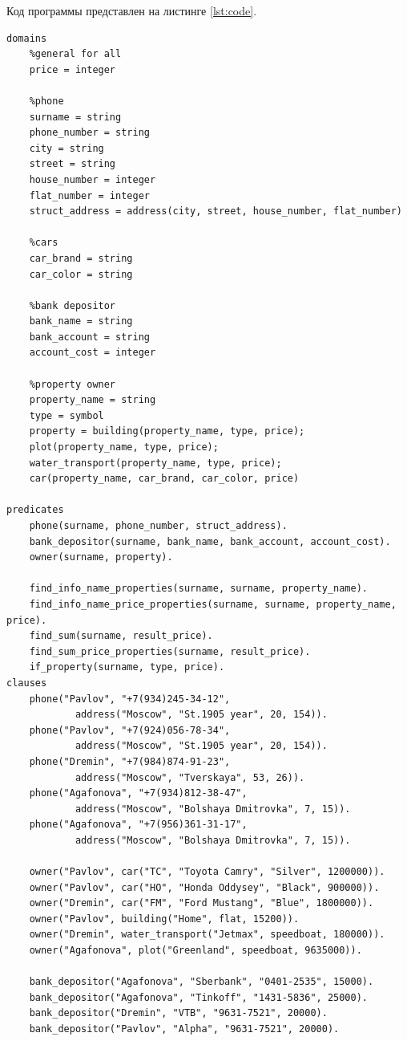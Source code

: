Код программы представлен на листинге \ref{lst:code}.

\begin{lstlisting}[label=lst:code, basicstyle=\footnotesize, caption=Код программы]
domains
	%general for all
	price = integer
	
	%phone
	surname = string
	phone_number = string
	city = string
	street = string
	house_number = integer
	flat_number = integer
	struct_address = address(city, street, house_number, flat_number)
	
	%cars
	car_brand = string
	car_color = string
	
	%bank depositor
	bank_name = string
	bank_account = string
	account_cost = integer
	
	%property owner
	property_name = string
	type = symbol
	property = building(property_name, type, price);
	plot(property_name, type, price);
	water_transport(property_name, type, price);
	car(property_name, car_brand, car_color, price)
	
predicates
	phone(surname, phone_number, struct_address).
	bank_depositor(surname, bank_name, bank_account, account_cost).
	owner(surname, property).
	
	find_info_name_properties(surname, surname, property_name).
	find_info_name_price_properties(surname, surname, property_name, price).
	find_sum(surname, result_price).
	find_sum_price_properties(surname, result_price).
	if_property(surname, type, price).
clauses
	phone("Pavlov", "+7(934)245-34-12", 
			address("Moscow", "St.1905 year", 20, 154)).
	phone("Pavlov", "+7(924)056-78-34",
			address("Moscow", "St.1905 year", 20, 154)).
	phone("Dremin", "+7(984)874-91-23",
			address("Moscow", "Tverskaya", 53, 26)).
	phone("Agafonova", "+7(934)812-38-47", 
			address("Moscow", "Bolshaya Dmitrovka", 7, 15)).
	phone("Agafonova", "+7(956)361-31-17", 
			address("Moscow", "Bolshaya Dmitrovka", 7, 15)).
	
	owner("Pavlov", car("TC", "Toyota Camry", "Silver", 1200000)).
	owner("Pavlov", car("HO", "Honda Oddysey", "Black", 900000)).
	owner("Dremin", car("FM", "Ford Mustang", "Blue", 1800000)).
	owner("Pavlov", building("Home", flat, 15200)).
	owner("Dremin", water_transport("Jetmax", speedboat, 180000)).
	owner("Agafonova", plot("Greenland", speedboat, 9635000)).
	
	bank_depositor("Agafonova", "Sberbank", "0401-2535", 15000).
	bank_depositor("Agafonova", "Tinkoff", "1431-5836", 25000).
	bank_depositor("Dremin", "VTB", "9631-7521", 20000).
	bank_depositor("Pavlov", "Alpha", "9631-7521", 20000).
	

\end{lstlisting}
